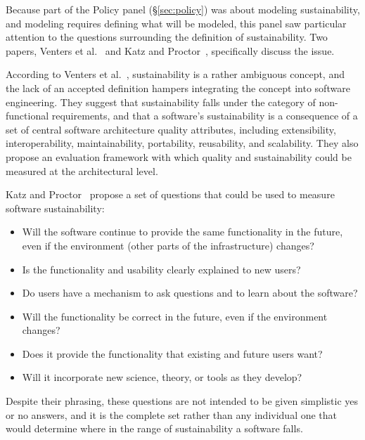 \documentclass[11pt, oneside]{amsart}
\begin{document}
Because part of the Policy panel (\S\ref{sec:policy}) was about
modeling sustainability, and modeling requires defining what will be
modeled, this panel saw particular attention to the questions
surrounding the definition of sustainability. Two papers, Venters et
al.~\cite{Venters_WSSSPE} and Katz and Proctor~\cite{Katz_WSSSPE},
specifically discuss the issue.

According to Venters et al.~\cite{Venters_WSSSPE}, sustainability is a
rather ambiguous concept, and the lack of an accepted definition
hampers integrating the concept into software engineering. They
suggest that sustainability falls under the category of non-functional
requirements, and that a software's sustainability is a consequence of
a set of central software architecture quality attributes, including
extensibility, interoperability, maintainability, portability,
reusability, and scalability. They also propose an evaluation
framework with which quality and sustainability could be measured at
the architectural level.

Katz and Proctor~\cite{Katz_WSSSPE} propose a set of questions that
could be used to measure software sustainability:
\begin{itemize}
\item Will the software continue to provide the same functionality in
  the future, even if the environment (other parts of the
  infrastructure) changes?
\item Is the functionality and usability clearly explained to new
  users?
\item Do users have a mechanism to ask questions and to learn about
  the software?
\item Will the functionality be correct in the future, even if the
  environment changes?
\item Does it provide the functionality that existing and future users
  want?
\item Will it incorporate new science, theory, or tools as they
  develop?
\end{itemize}
Despite their phrasing, these questions are not intended to be given
simplistic yes or no answers, and it is the complete set rather than
any individual one that would determine where in the range of
sustainability a software falls.
\end{document}
